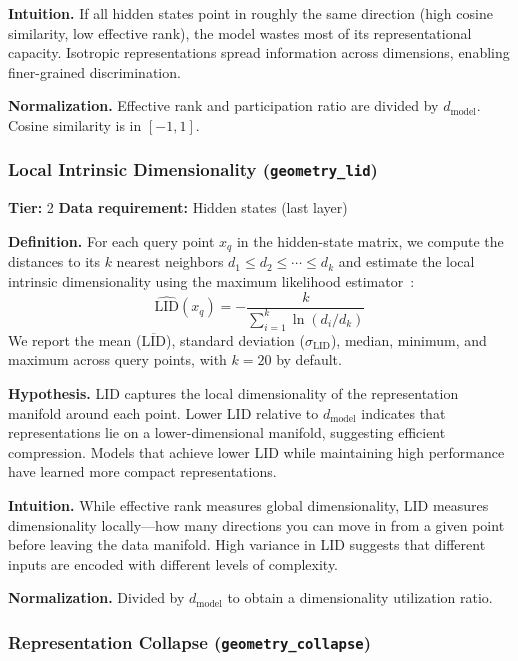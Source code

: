 \documentclass{article}
\begin{document}
\textbf{Intuition.}
If all hidden states point in roughly the same direction (high cosine similarity, low effective rank), the model wastes most of its representational capacity. Isotropic representations spread information across dimensions, enabling finer-grained discrimination.

\textbf{Normalization.} Effective rank and participation ratio are divided by $d_{\text{model}}$. Cosine similarity is in $[-1, 1]$.

\subsubsection{Local Intrinsic Dimensionality (\texttt{geometry\_lid})}
\label{app:lid}

\textbf{Tier:} 2 \quad \textbf{Data requirement:} Hidden states (last layer)

\textbf{Definition.}
For each query point $x_q$ in the hidden-state matrix, we compute the distances to its $k$ nearest neighbors $d_1 \leq d_2 \leq \cdots \leq d_k$ and estimate the local intrinsic dimensionality using the maximum likelihood estimator~\citep{levina2004maximum}:
\begin{equation}
  \widehat{\text{LID}}(x_q) = -\frac{k}{\sum_{i=1}^{k} \ln(d_i / d_k)}
\end{equation}
We report the mean ($\overline{\text{LID}}$), standard deviation ($\sigma_{\text{LID}}$), median, minimum, and maximum across query points, with $k=20$ by default.

\textbf{Hypothesis.}
LID captures the local dimensionality of the representation manifold around each point. Lower LID relative to $d_{\text{model}}$ indicates that representations lie on a lower-dimensional manifold, suggesting efficient compression. Models that achieve lower LID while maintaining high performance have learned more compact representations.

\textbf{Intuition.}
While effective rank measures global dimensionality, LID measures dimensionality locally---how many directions you can move in from a given point before leaving the data manifold. High variance in LID suggests that different inputs are encoded with different levels of complexity.

\textbf{Normalization.} Divided by $d_{\text{model}}$ to obtain a dimensionality utilization ratio.

\subsubsection{Representation Collapse (\texttt{geometry\_collapse})}
\label{app:collapse}
\end{document}
